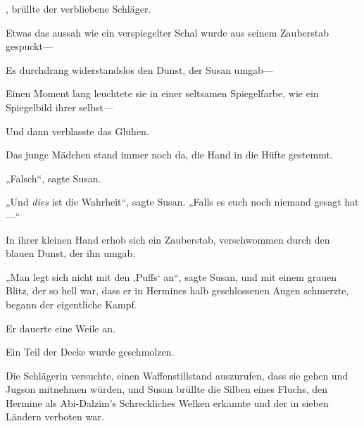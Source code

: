 , brüllte der verbliebene Schläger.

Etwas das aussah wie ein verspiegelter Schal wurde aus seinem Zauberstab gespuckt—

Es durchdrang widerstandslos den Dunst, der Susan umgab—

Einen Moment lang leuchtete sie in einer seltsamen Spiegelfarbe, wie ein Spiegelbild ihrer selbst—

Und dann verblasste das Glühen.

Das junge Mädchen stand immer noch da, die Hand in die Hüfte gestemmt.

„Falsch“, sagte Susan.

„Und \emph{dies} ist die Wahrheit“, sagte Susan. „Falls es euch noch niemand gesagt hat—“

In ihrer kleinen Hand erhob sich ein Zauberstab, verschwommen durch den blauen Dunst, der ihn umgab.

„Man legt sich nicht mit den ‚Puffs‘ an“, sagte Susan, und mit einem grauen Blitz, der so hell war, dass er in Hermines halb geschlossenen Augen schmerzte, begann der eigentliche Kampf.

Er dauerte eine Weile an.

Ein Teil der Decke wurde geschmolzen.

Die Schlägerin versuchte, einen Waffenstillstand auszurufen, dass sie gehen und Jugson mitnehmen würden, und Susan brüllte die Silben eines Fluchs, den Hermine als Abi-Dalzim’s Schreckliches Welken erkannte und der in sieben Ländern verboten war.

